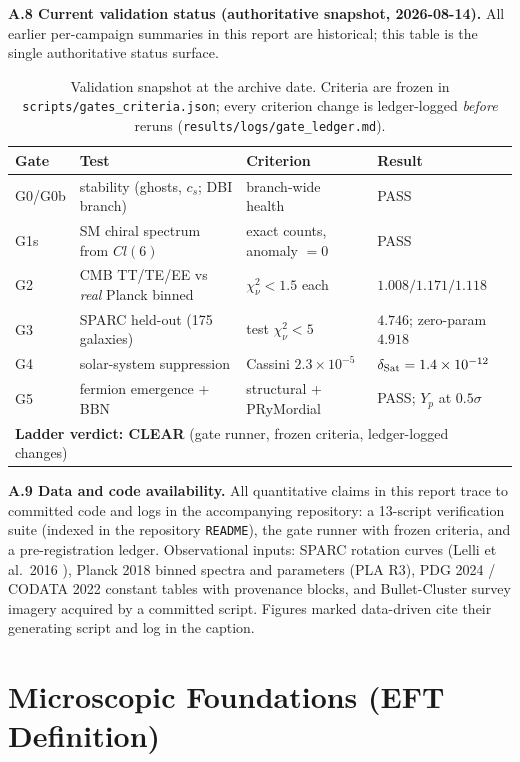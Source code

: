 \documentclass[a4paper,12pt]{article}
\begin{document}
\textbf{A.8 Current validation status (authoritative snapshot, 2026-08-14).}
All earlier per-campaign summaries in this report are historical; this table is
the single authoritative status surface.
\begin{table}[H]
\centering
\footnotesize
\begin{tabular}{llll}
\toprule
\textbf{Gate} & \textbf{Test} & \textbf{Criterion} & \textbf{Result} \\
\midrule
G0/G0b & stability (ghosts, $c_s$; DBI branch) & branch-wide health & PASS \\
G1s & SM chiral spectrum from $Cl(6)$ & exact counts, anomaly $=0$ & PASS \\
G2 & CMB TT/TE/EE vs \emph{real} Planck binned & $\chi^2_\nu < 1.5$ each & $1.008/1.171/1.118$ \\
G3 & SPARC held-out (175 galaxies) & test $\chi^2_\nu < 5$ & $4.746$; zero-param $4.918$ \\
G4 & solar-system suppression & Cassini $2.3\times10^{-5}$ & $\delta_{\rm Sat}=1.4\times10^{-12}$ \\
G5 & fermion emergence + BBN & structural + PRyMordial & PASS; $Y_p$ at $0.5\sigma$ \\
\midrule
\multicolumn{4}{l}{\textbf{Ladder verdict: CLEAR} (gate runner, frozen criteria, ledger-logged changes)} \\
\bottomrule
\end{tabular}
\caption{Validation snapshot at the archive date. Criteria are frozen in
\texttt{scripts/\allowbreak gates\_\allowbreak criteria.json}; every criterion change is ledger-logged
\emph{before} reruns (\texttt{results/\allowbreak logs/\allowbreak gate\_\allowbreak ledger.md}).}
\end{table}

\textbf{A.9 Data and code availability.} All quantitative claims in this report
trace to committed code and logs in the accompanying repository: a 13-script
verification suite (indexed in the repository \texttt{README}), the gate runner
with frozen criteria, and a pre-registration ledger. Observational inputs:
SPARC rotation curves (Lelli et al.\ 2016 \cite{lelli}), Planck 2018 binned spectra and
parameters (PLA R3), PDG 2024 / CODATA 2022 constant tables with provenance
blocks, and Bullet-Cluster survey imagery acquired by a committed script.
Figures marked data-driven cite their generating script and log in the caption.

\section{Microscopic Foundations (EFT Definition)}
\end{document}
